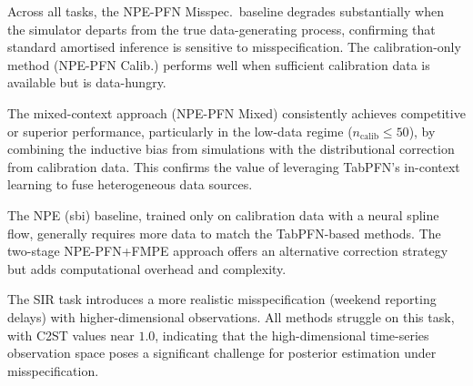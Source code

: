 \documentclass[11pt]{article}
\begin{document}
Across all tasks, the NPE-PFN Misspec.\ baseline degrades substantially
when the simulator departs from the true data-generating process,
confirming that standard amortised inference is sensitive to
misspecification.
The calibration-only method (NPE-PFN Calib.) performs well when
sufficient calibration data is available but is data-hungry.

The mixed-context approach (NPE-PFN Mixed) consistently achieves
competitive or superior performance, particularly in the low-data regime
($n_{\mathrm{calib}} \leq 50$), by combining the inductive bias from
simulations with the distributional correction from calibration data.
This confirms the value of leveraging TabPFN's in-context learning to
fuse heterogeneous data sources.

The NPE (sbi) baseline, trained only on calibration data with a neural
spline flow, generally requires more data to match the TabPFN-based
methods.  The two-stage NPE-PFN+FMPE approach offers an alternative
correction strategy but adds computational overhead and complexity.

The SIR task introduces a more realistic misspecification
(weekend reporting delays) with higher-dimensional observations.
All methods struggle on this task, with C2ST values near $1.0$,
indicating that the high-dimensional time-series observation space
poses a significant challenge for posterior estimation under
misspecification.
\end{document}
